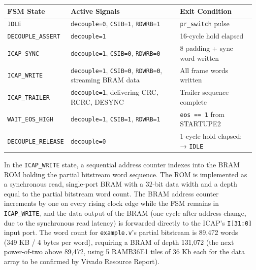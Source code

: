 \begin{table}[htbp]
\centering
\begin{tabular}{lll}
\toprule
FSM State & Active Signals & Exit Condition \\
\midrule
\texttt{IDLE} & \texttt{decouple=0}, \texttt{CSIB=1}, \texttt{RDWRB=1} & \texttt{pr\_switch} pulse \\
\texttt{DECOUPLE\_ASSERT} & \texttt{decouple=1} & 16-cycle hold elapsed \\
\texttt{ICAP\_SYNC} & \texttt{decouple=1}, \texttt{CSIB=0}, \texttt{RDWRB=0} & 8 padding + sync word written \\
\texttt{ICAP\_WRITE} & \texttt{decouple=1}, \texttt{CSIB=0}, \texttt{RDWRB=0}, streaming BRAM data & All frame words written \\
\texttt{ICAP\_TRAILER} & \texttt{decouple=1}, delivering CRC, RCRC, DESYNC & Trailer sequence complete \\
\texttt{WAIT\_EOS\_HIGH} & \texttt{decouple=1}, \texttt{CSIB=1}, \texttt{RDWRB=1} & \texttt{eos == 1} from STARTUPE2 \\
\texttt{DECOUPLE\_RELEASE} & \texttt{decouple=0} & 1-cycle hold elapsed; → \texttt{IDLE} \\
\bottomrule
\end{tabular}
\end{table}

In the \texttt{ICAP\_WRITE} state, a sequential address counter indexes into the BRAM ROM holding the partial bitstream word sequence. The ROM is implemented as a synchronous read, single-port BRAM with a 32-bit data width and a depth equal to the partial bitstream word count. The BRAM address counter increments by one on every rising clock edge while the FSM remains in \texttt{ICAP\_WRITE}, and the data output of the BRAM (one cycle after address change, due to the synchronous read latency) is forwarded directly to the ICAP's \texttt{I[31:0]} input port. The word count for \texttt{example.v}'s partial bitstream is 89,472 words (349 KB / 4 bytes per word), requiring a BRAM of depth 131,072 (the next power-of-two above 89,472, using 5 RAMB36E1 tiles of 36 Kb each for the data array to be confirmed by Vivado Resource Report).

